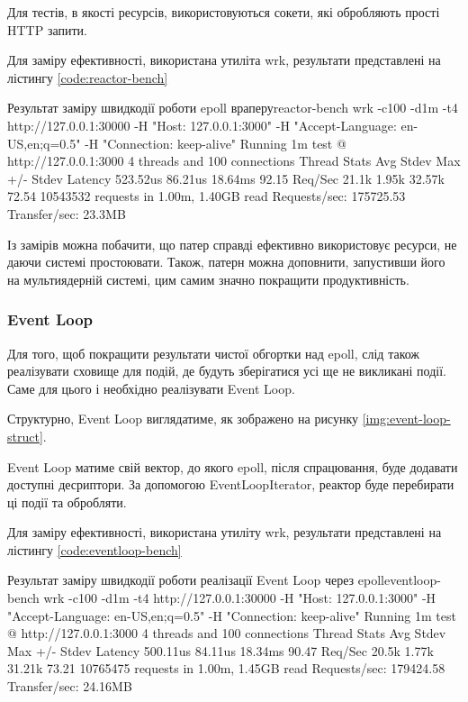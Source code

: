 \documentclass{lib/styles/default-style}
\begin{document}

    Для тестів, в якості ресурсів, використовуються сокети, які обробляють прості HTTP запити.

    Для заміру ефективності, використана утиліта wrk, результати представлені на лістингу \ref{code:reactor-bench}

    \begin{stdout}{Результат заміру швидкодії роботи epoll враперу}{reactor-bench}
        wrk -c100 -d1m -t4 http://127.0.0.1:30000 -H "Host: 127.0.0.1:3000" -H "Accept-Language: en-US,en;q=0.5" -H "Connection: keep-alive"
        Running 1m test @ http://127.0.0.1:3000
        4 threads and 100 connections
        Thread Stats   Avg      Stdev     Max   +/- Stdev
            Latency   523.52us   86.21us  18.64ms   92.15%
            Req/Sec    21.1k     1.95k   32.57k    72.54%
        10543532 requests in 1.00m, 1.40GB read
        Requests/sec: 175725.53
        Transfer/sec:     23.3MB
    \end{stdout}

    Із замірів можна побачити, що патер справді ефективно використовує ресурси, не даючи системі простоювати.
    Також, патерн можна доповнити, запустивши його на мультиядерній системі, цим самим значно покращити продуктивність.

    \subsubsection{Event Loop}
    
    Для того, щоб покращити результати чистої обгортки над epoll,
    слід також реалізувати сховище для подій, де будуть зберігатися усі ще не викликані події. 
    Саме для цього і необхідно реалізувати Event Loop.

    Структурно, Event Loop виглядатиме, як зображено на рисунку \ref{img:event-loop-struct}.


    Event Loop матиме свій вектор, до якого epoll, після спрацювання, буде додавати доступні десриптори.
    За допомогою EventLoopIterator, реактор буде перебирати ці події та обробляти.

    Для заміру ефективності, використана утиліту wrk, результати представлені на лістингу \ref{code:eventloop-bench}

    \begin{stdout}{Результат заміру швидкодії роботи реалізації Event Loop через epoll}{eventloop-bench}
        wrk -c100 -d1m -t4 http://127.0.0.1:30000 -H "Host: 127.0.0.1:3000" -H "Accept-Language: en-US,en;q=0.5" -H "Connection: keep-alive"
        Running 1m test @ http://127.0.0.1:3000
        4 threads and 100 connections
        Thread Stats   Avg      Stdev     Max   +/- Stdev
            Latency   500.11us   84.11us  18.34ms   90.47%
            Req/Sec    20.5k     1.77k   31.21k    73.21%
        10765475 requests in 1.00m, 1.45GB read
        Requests/sec:  179424.58
        Transfer/sec:     24.16MB
    \end{stdout}
\end{document}
